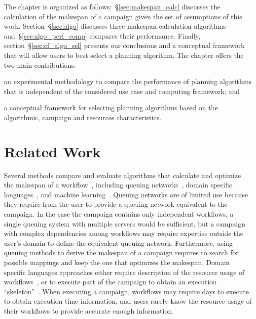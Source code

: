 The chapter is organized as follows:~\S\ref{sec:makespan_calc} discusses the
calculation of the makespan of a campaign given the set of assumptions of this
work. Section~\S\ref{sec:algo} discusses three makespan calculation algorithms
and~\S\ref{sec:algo_perf_comp} compares their performance. Finally,
section~\S\ref{sec:cf_algo_sel} presents our conclusions and a conceptual
framework that will allow users to best select a planning algorithm. The chapter
offers the two main contributions:
\begin{inparaenum}[(i)]
    \item an experimental methodology to compare the performance of planning
    algorithms that is independent of the considered use case and computing
    framework; and
    \item a conceptual framework for selecting planning algorithms based on the
    algorithmic, campaign and resources characteristics.
\end{inparaenum}


\section{Related Work}

Several methods compare and evaluate algorithms that calculate and optimize the
makespan of a workflow~\cite{lu2019review}, including queuing
networks~\cite{yao2019throughput,bao2019performance}, domain specific
languages~\cite{carothers2017durango,maheshwari2016workflow}, and machine
learning~\cite{witt2019predictive,pumma2017runtime}. Queuing networks are of
limited use because they require from the user to provide a queuing network
equivalent to the campaign. In the case the campaign contains only independent
workflows, a single queuing system with multiple servers would be sufficient,
but a campaign with complex dependencies among workflows may require expertise
outside the user's domain to define the equivalent queuing network. Furthermore,
using queuing methods to derive the makespan of a campaign requires to search
for possible mappings and keep the one that optimizes the makespan. Domain
specific languages approaches either require description of the resource usage
of workflows~\cite{carothers2017durango}, or to execute part of the campaign to
obtain an execution ``skeleton''~\cite{maheshwari2016workflow}.
When executing a campaign, workflows may require days to execute to obtain
execution time information, and users rarely know the resource usage of their
workflows to provide accurate enough information.

